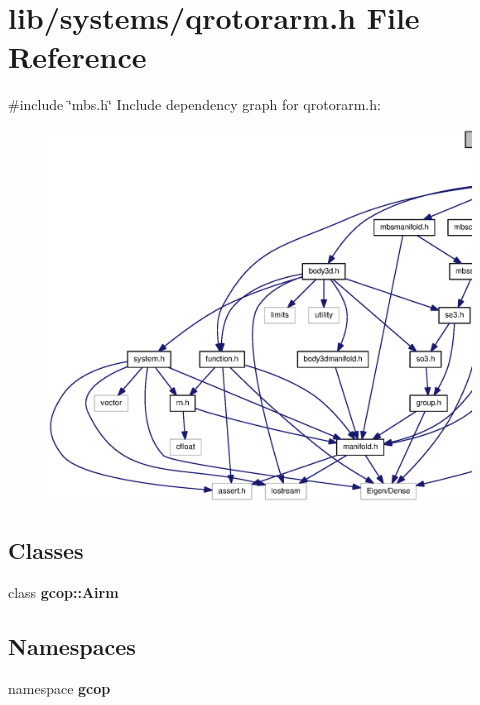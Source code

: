 \section{lib/systems/qrotorarm.h \-File \-Reference}
\label{qrotorarm_8h}
{\ttfamily \#include \char`\"{}mbs.\-h\char`\"{}}\*
\-Include dependency graph for qrotorarm.\-h\-:\nopagebreak
\begin{figure}[H]
\begin{center}
\leavevmode
\includegraphics[width=350pt]{qrotorarm_8h__incl}
\end{center}
\end{figure}
\subsection*{\-Classes}
\begin{DoxyCompactItemize}
\item 
class {\bf gcop\-::\-Airm}
\end{DoxyCompactItemize}
\subsection*{\-Namespaces}
\begin{DoxyCompactItemize}
\item 
namespace {\bf gcop}
\end{DoxyCompactItemize}

